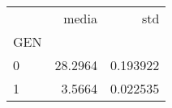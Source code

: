\begin{tabular}{lrr}
\toprule
{} &    media &       std \\
GEN &          &           \\
\midrule
0   &  28.2964 &  0.193922 \\
1   &   3.5664 &  0.022535 \\
\bottomrule
\end{tabular}
